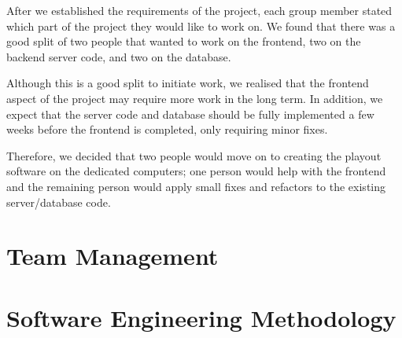 \documentclass{article}
\begin{document}
After we established the requirements of the project, each group member stated
which part of the project they would like to work on. We found that there was a
good split of two people that wanted to work on the frontend, two on the backend
server code, and two on the database.

Although this is a good split to initiate work, we realised that the frontend 
aspect of the project may require more work in the long term. In addition, we 
expect that the server code and database should be fully implemented a few
weeks before the frontend is completed, only requiring minor fixes.

Therefore, we decided that two people would move on to creating the playout 
software on the dedicated computers; one person would help with the frontend and
the remaining person would apply small fixes and refactors to the existing 
server/database code. 


\section{Team Management}


\section{Software Engineering Methodology}
\end{document}
